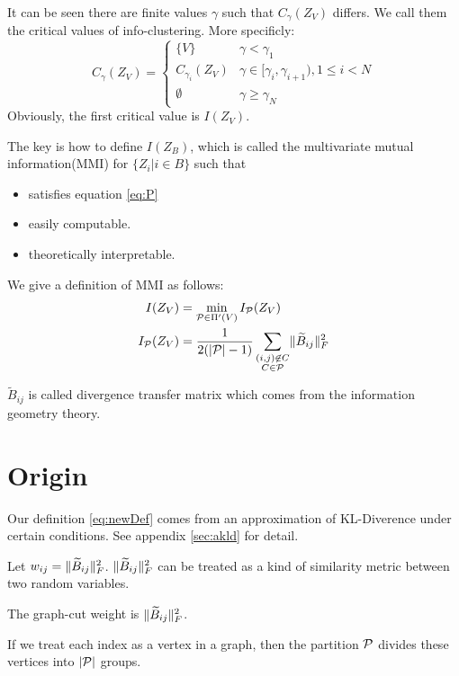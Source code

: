 \documentclass{article}
\begin{document}
It can be seen there are finite values $\gamma$ such that $C_{\gamma}(Z_V)$ differs.
We call them the critical values of info-clustering.
More specificly:
\begin{equation*}
C_{\gamma}(Z_V) = \begin{cases}
\{V\} & \gamma < \gamma_1 \\
C_{\gamma_i}(Z_V) & \gamma \in [\gamma_i, \gamma_{i+1}), 1\leq i < N \\
\emptyset & \gamma \geq \gamma_N
\end{cases}
\end{equation*}
Obviously, the first critical value is $I(Z_V)$.

The key is how to define $I(Z_B)$, which is called the multivariate mutual information(MMI) for $\{Z_i | i
\in B\}$ such that
\begin{itemize}
\item satisfies equation \eqref{eq:P}
\item easily computable.
\item theoretically interpretable.
\end{itemize}

We give a definition of MMI as follows:
\begin{align}
I(Z_V) & = \min_{\mathcal{P} \in \Pi'(V)} I_{\mathcal{P}}(Z_V) \\
\label{eq:newDef}  I_{\mathcal{P}}(Z_V) & = \frac{1}{ 2( \abs{\mathcal{P}} - 1) } \sum_{\substack{(i,j) \not\in C\\ C\in \mathcal{P}}} \norm{\widetilde{B}_{ij}}_F^2
\end{align}

$\widetilde{B}_{ij}$ is called divergence transfer matrix which comes from the information geometry theory.

\section{Origin}
Our definition \eqref{eq:newDef} comes from an approximation of KL-Diverence under certain conditions. See appendix \ref{sec:akld} for detail.

Let $w_{ij} = \norm{\widetilde{B}_{ij}}_F^2$.
$\norm{\widetilde{B}_{ij}}_F^2$ can be treated as a kind of similarity metric between two random variables.

The graph-cut weight is $\norm{\widetilde{B}_{ij}}_F^2$.

If we treat each index as a vertex in a graph, then the partition $\P$ divides these vertices into $\abs{\P}$ groups. 
\end{document}

